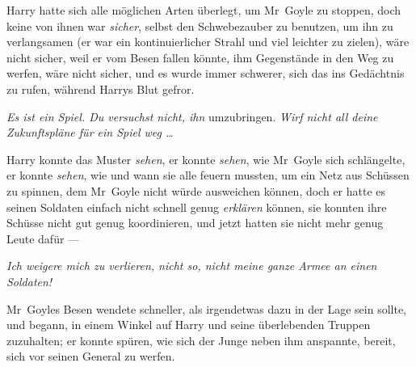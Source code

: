 Harry hatte sich alle möglichen Arten überlegt, um Mr~Goyle zu stoppen, doch keine von ihnen war \emph{sicher}, selbst den Schwebezauber zu benutzen, um ihn zu verlangsamen (er war ein kontinuierlicher Strahl und viel leichter zu zielen), wäre nicht sicher, weil er vom Besen fallen könnte, ihm Gegenstände in den Weg zu werfen, wäre nicht sicher, und es wurde immer schwerer, sich das ins Gedächtnis zu rufen, während Harrys Blut gefror.

\emph{Es ist ein Spiel. Du versuchst nicht, ihn} umzubringen. \emph{Wirf nicht all deine Zukunftspläne für ein Spiel weg …}

Harry konnte das Muster \emph{sehen}, er konnte \emph{sehen}, wie Mr~Goyle sich schlängelte, er konnte \emph{sehen}, wie und wann sie alle feuern mussten, um ein Netz aus Schüssen zu spinnen, dem Mr~Goyle nicht würde ausweichen können, doch er hatte es seinen Soldaten einfach nicht schnell genug \emph{erklären} können, sie konnten ihre Schüsse nicht gut genug koordinieren, und jetzt hatten sie nicht mehr genug Leute dafür —

\emph{Ich weigere mich zu verlieren, nicht so, nicht meine ganze Armee an einen Soldaten!}

Mr~Goyles Besen wendete schneller, als irgendetwas dazu in der Lage sein sollte, und begann, in einem Winkel auf Harry und seine überlebenden Truppen zuzuhalten; er konnte spüren, wie sich der Junge neben ihm anspannte, bereit, sich vor seinen General zu werfen.

